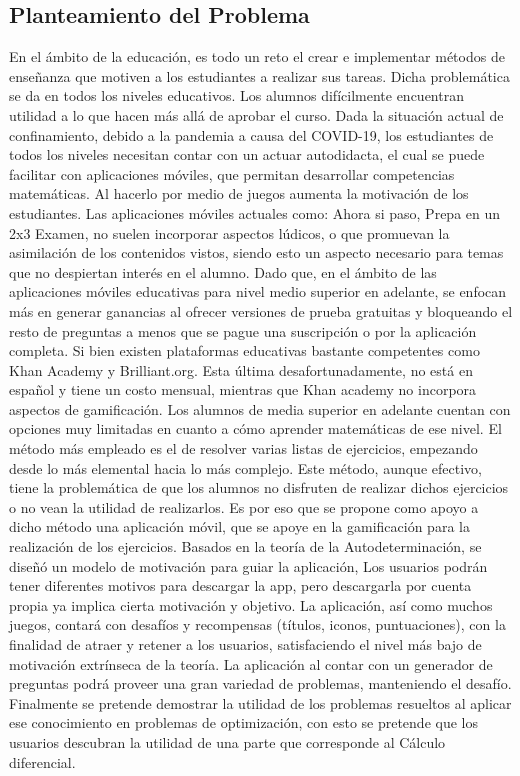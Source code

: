\documentclass{article}
\begin{document}
\subsection{Planteamiento del Problema}
En el ámbito de la educación, es todo un reto el crear e implementar métodos de enseñanza que motiven a los estudiantes a realizar sus tareas. Dicha problemática se da en todos los niveles educativos. Los alumnos difícilmente encuentran utilidad a lo que hacen más allá de aprobar el curso. Dada la situación actual de confinamiento, debido a la pandemia a causa del COVID-19, los estudiantes de todos los niveles necesitan contar con un actuar autodidacta, el cual se puede facilitar con aplicaciones móviles, que permitan desarrollar competencias matemáticas. Al hacerlo por medio de juegos aumenta la motivación de los estudiantes.
Las aplicaciones móviles actuales como: Ahora si paso, Prepa en un 2x3 Examen, no suelen incorporar aspectos lúdicos, o que promuevan la asimilación de los contenidos vistos, siendo esto un aspecto necesario para temas que no despiertan interés en el alumno. Dado que, en el ámbito de las aplicaciones móviles educativas para nivel medio superior en adelante, se enfocan más en generar ganancias al ofrecer versiones de prueba gratuitas y bloqueando el resto de preguntas a menos que se pague una suscripción o por la aplicación completa. 
Si bien existen plataformas educativas bastante competentes como Khan Academy y Brilliant.org. Esta última desafortunadamente, no está en español y tiene un costo mensual, mientras que Khan academy no incorpora aspectos de gamificación. 
Los alumnos de media superior en adelante cuentan con opciones muy limitadas en cuanto a cómo aprender matemáticas de ese nivel. El método más empleado es el de resolver varias listas de ejercicios, empezando desde lo más elemental hacia lo más complejo. Este método, aunque efectivo, tiene la problemática de que los alumnos no disfruten de realizar dichos ejercicios o no vean la utilidad de realizarlos. 
Es por eso que se propone como apoyo a dicho método una aplicación móvil, que se apoye en la gamificación para la realización de los ejercicios. Basados en la teoría de la Autodeterminación, se diseñó un modelo de motivación para guiar la aplicación,
Los usuarios podrán tener diferentes motivos para descargar la app, pero descargarla por cuenta propia ya implica cierta motivación y objetivo. La aplicación, así como muchos juegos, contará con desafíos y recompensas (títulos, iconos, puntuaciones), con la finalidad de atraer y retener a los usuarios, satisfaciendo el nivel más bajo de motivación extrínseca de la teoría. La aplicación al contar con un generador de preguntas podrá proveer una gran variedad de problemas, manteniendo el desafío. Finalmente se pretende demostrar la utilidad de los problemas resueltos al aplicar ese conocimiento en problemas de optimización, con esto se pretende que los usuarios descubran la utilidad de una parte que corresponde al  Cálculo diferencial. 
\end{document}
